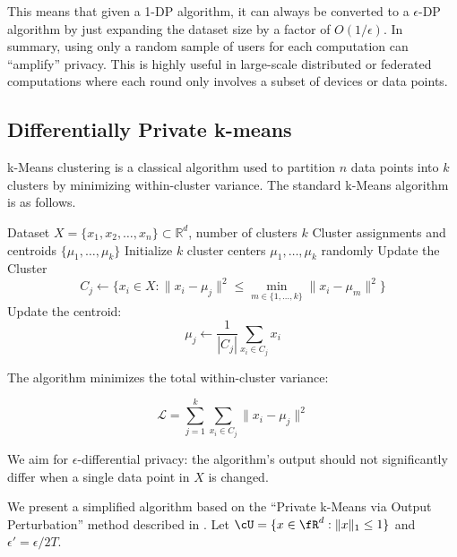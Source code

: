 \documentclass[11pt, a4paper]{article}
\begin{document}
This means that given a 1-DP algorithm, it can always be converted to a $\epsilon$-DP algorithm by
just expanding the dataset size by a factor of $O(1/\epsilon)$. 
In summary, using only a random sample of users for each computation can ``amplify'' privacy.
This is highly useful in large-scale distributed or federated computations where each round only involves a subset of devices or data points.


\subsection{Differentially Private k-means}

k-Means clustering is a classical algorithm used to partition $n$ data points into $k$ clusters by minimizing within-cluster variance.
The standard k-Means algorithm is as follows.
\begin{algorithm}[h!]
\caption{k-Means Clustering}
\begin{algorithmic}[1]
\REQUIRE Dataset $X = \{x_1, x_2, \dots, x_n\} \subset \mathbb{R}^d$, number of clusters $k$
\ENSURE Cluster assignments and centroids $\{\mu_1, \dots, \mu_k\}$
\STATE Initialize $k$ cluster centers $\mu_1, \dots, \mu_k$ randomly
    \STATE  Update the Cluster
        \[
        C_j \leftarrow \{ x_i \in X: \|x_i - \mu_j\|^2 \leq \min_{m \in \{1, \dots, k\}} \|x_i - \mu_m\|^2\}
        \]
    \ENDFOR
        \STATE Update the centroid:
        \[
        \mu_j \leftarrow \frac{1}{|C_j|} \sum_{x_i \in C_j} x_i
        \]
    \ENDFOR
\ENDFOR
\end{algorithmic}
\end{algorithm}


The algorithm minimizes the total within-cluster variance:

\[
\mathcal{L} = \sum_{j=1}^{k} \sum_{x_i \in C_j} \|x_i - \mu_j\|^2
\]


We aim for $\epsilon$-differential privacy:
the algorithm's output should not significantly differ when a single data point in $X$ is changed.

We present a simplified algorithm based on the ``Private k-Means via Output Perturbation'' 
method described in \cite{nissim2007smooth, dwork2014algorithmic}.
Let $\cU = \{x\in\fR^d : \|x\|_1\leq 1\}$ and $\epsilon' = \epsilon/2T$.
\end{document}
